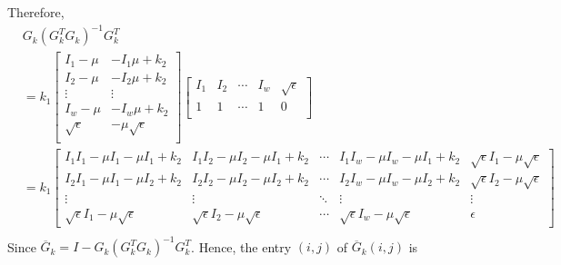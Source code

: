 \documentclass[journal]{IEEEtran}
\begin{document}
\newpage
Therefore, 
\begin{equation}
    \begin{aligned}
        & G_k (G_k^T G_k)^{-1} G_k^T  \\
                            &= k_1 \begin{bmatrix}
                                I_1 - \mu & -I_1 \mu + k_2 \\
                                I_2 - \mu & -I_2 \mu + k_2 \\
                                \vdots & \vdots \\
                                I_w - \mu & -I_w \mu + k_2 \\
                                \sqrt{\epsilon} & -\mu \sqrt{\epsilon} \\
                            \end{bmatrix} 
                            \begin{bmatrix}
                                I_1 & I_2 & \cdots & I_{w} & \sqrt{\epsilon} \\
                                1 & 1 & \cdots & 1 & 0 \\
                            \end{bmatrix} \\
        &= k_1 \begin{bmatrix}
                I_{1}I_{1}-\mu I_{1} -\mu I_{1} + k_2 & 
                I_{1}I_{2}-\mu I_{2} -\mu I_{1} + k_2 & 
                \cdots &
                I_{1}I_{w}-\mu I_{w} -\mu I_{1} + k_2 & 
                \sqrt{\epsilon} I_{1} - \mu \sqrt{\epsilon} \\

                I_{2}I_{1}-\mu I_{1} -\mu I_{2} + k_2 & 
                I_{2}I_{2}-\mu I_{2} -\mu I_{2} + k_2 & 
                \cdots &
                I_{2}I_{w}-\mu I_{w} -\mu I_{2} + k_2 & 
                \sqrt{\epsilon} I_{2} - \mu \sqrt{\epsilon} \\
                
                \vdots & \vdots & \ddots & \vdots & \vdots \\
                
                \sqrt{\epsilon} I_1 - \mu \sqrt{\epsilon} &
                \sqrt{\epsilon} I_2 - \mu \sqrt{\epsilon} &
                \cdots &
                \sqrt{\epsilon} I_w - \mu \sqrt{\epsilon} &
                \epsilon
               \end{bmatrix}\\ 
    \end{aligned}
    \label{equ25}
\end{equation}
Since
$\overline{G}_k = I - G_k (G_k^T G_k)^{-1} G_k^T$.
Hence, the entry $(i,j)$ of $\overline{G}_{k}(i,j)$ is
\end{document}
